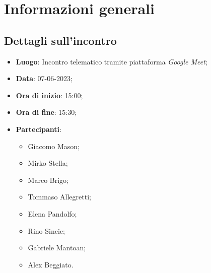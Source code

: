 \section{Informazioni generali}

\subsection{Dettagli sull'incontro}
\begin{itemize}
\item \textbf{Luogo}: Incontro telematico tramite piattaforma \textit{Google Meet};
\item \textbf{Data}: 07-06-2023;
\item \textbf{Ora di inizio}: 15:00;
\item \textbf{Ora di fine}: 15:30;
\item \textbf{Partecipanti}: 
\begin{itemize}
	\item Giacomo Mason;
	\item Mirko Stella;
	\item Marco Brigo;
	\item Tommaso Allegretti;
	\item Elena Pandolfo;
	\item Rino Sincic;
	\item Gabriele Mantoan;
	\item Alex Beggiato.
\end{itemize}
\end{itemize}
